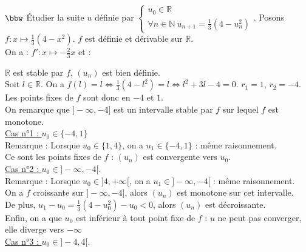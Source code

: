 \documentclass[11pt]{article}
\begin{document}
\begin{exercice}{$\bbw$}{}
    Étudier la suite $u$ définie par $\begin{cases}
        u_0 \in \mathbb{R}\\
        \forall n \in \mathbb{N} ~ u_{n+1} = \frac{1}{3}(4-u_n^2)
    \end{cases}$.
    \tcblower
    Posons $f:x\mapsto \frac{1}{3}(4-x^2)$. $f$ est définie et dérivable sur $\mathbb{R}$.\\
    On a : $f':x\mapsto -\frac{2}{3}x$ et :
    \begin{center}
    \end{center}
    $\mathbb{R}$ est stable par $f$, $(u_n)$ est bien définie.\\
    Soit $l\in\mathbb{R}$. On a $f(l)=l \iff \frac{1}{3}(4-l^2) = l \iff l^2 + 3l - 4 = 0$. $r_1 = 1$, $r_2 = -4$.\\
    Les points fixes de $f$ sont donc en $-4$ et $1$.\\
    On remarque que $]-\infty, -4]$ est un intervalle stable par $f$ sur lequel $f$ est monotone.\\[0.2cm]
    \underline{Cas n°1 : $u_0 \in \{-4,1\}$}\\
    Remarque : Lorsque $u_0 \in \{1,4\}$, on a $u_1 \in \{-4,1\}$ : même raisonnement.\\
    Ce sont les points fixes de $f$ : $(u_n)$ est convergente vers $u_0$.\\[0.4cm]
    \underline{Cas n°2 : $u_0 \in ]-\infty, -4[$}.\\
    Remarque : Lorsque $u_0\in]4,+\infty[$, on a $u_1\in]-\infty, -4[$ : même raisonnement.\\
    On a $f$ croissante sur $]-\infty,-4]$, alors $(u_n)$ est monotone sur cet intervalle.\\
    De plus, $u_1 - u_0 = \frac{1}{3}(4-u_0^2) - u_0 < 0$, alors $(u_n)$ est décroissante.\\
    Enfin, on a que $u_0$ est inférieur à tout point fixe de $f$ : $u$ ne peut pas converger, elle diverge vers $-\infty$\\[0.4cm]
    \underline{Cas n°3 : $u_0 \in ]-4,4[$}.\\

\end{exercice}
\end{document}
